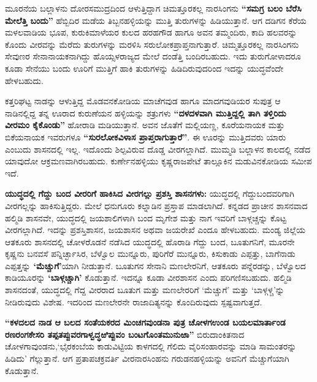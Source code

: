 ಮೂರನೆಯ ಬಲ್ಲಾಳನು ದೋರಸಮುದ್ರದಿಂದ ಆಳುತ್ತಿದ್ದಾಗ ಚಿಮತ್ತೂರಕಲ್ಲ ನಾರಸಿಂಗನು \textbf{“ಸಮಗ್ರ ಬಲಂ ಬೆರೆಸಿ ಮೇಲೆತ್ತಿ ಬಂದು” }ಹೆಬ್ಬಿದಿರ ಮಡೆಯ ತಿಬ್ಬನಹಳ್ಳಿಯನ್ನು ಮುತ್ತಿ ತುರುಗಳನ್ನು ಹಿಡಿಯುತ್ತಾನೆ. ಆಗ ದಡಿಗನ ಕೆರೆಯ ಮಳಲವಾಡಿಯ ಭೂಪ, ಕುರುಕಿಮಾಳೆಯರ ಕುಲದ ಹರಹಗೌಡ ಹಾಗೂ ಅವನ ತಮ್ಮಂದಿರು, ಕಾದಿ ಹಲವರನ್ನು ಕೊಂದು ವೀರವನ್ನು ಮೆರೆದು ತುರುಗಳನ್ನು ಮರಳಿಸಿ ಸರುಲೋಕಪ್ರಾಪ್ತನಾಗುತ್ತಾರೆ. ಚಿಮ್ಮತ್ತೂರಕಲ್ಲ ನಾರಸಿಂಗನು ಸೇವುಣರ ಸೇನಾನಾಯಕನಾಗಿದ್ದು ಹೊಯ್ಸಳರಾಜ್ಯದ ಮೇಲೆ ದಂಡೆತ್ತಿ ಬಂದಿರಬಹುದು. ಇದು ತುರುಗೋಳಾದರೂ ಕೂಡಾ ಸೇನೆಯು ಬಂದು ಊರಿಗೆ ಮುತ್ತಿಗೆ ಹಾಕಿ ತುರುಗಳನ್ನು ಹಿಡಿದಿರುವುದರಿಂದ ಇದನ್ನು ಯುದ್ಧವೆಂದೇ ಹೇಳಬಹುದು.

ಕತ್ತರಿಘಟ್ಟ ನಾಡನ್ನು ಆಳುತ್ತಿದ್ದ ಮೊಡವನಕೋಡಿಯ ಮಾಚೆಗವುಡ ಹಾಗೂ ಮಾದಗವುಡಿಯರ ಸುಪುತ್ರ ಆ ನಾಡಿನಲ್ಲಿದ್ದ ತನ್ನ ಊರಾದ ಕುರುಣೆಯನ ಹಳ್ಳಿಯನ್ನು ಶತ್ರುಗಳು \textbf{“ದಳದಳವಾಗಿ ಮುತ್ತಿದ್ದಲ್ಲಿ ತಾಗಿ ತಳ್ತಿರಿದು ವೀರಮಂ ಕೈಕೊಂಡು”} ಹೋರಾಡಿ ಮಡಿಯುತ್ತಾನೆ. ಅವನ ಜೊತೆಗೆ ಮಲ್ಲಿಯಣ್ಣ, ಕೂರೆಯನಾಯಕ ಮತ್ತು ಬಿಕೆಯನಾಯಕ ಇವರುಗಳೂ \textbf{“ಸುರಲೋಕವಿಳಾಸ ಪ್ರಾಪ್ತರಾಗುತ್ತಾರೆ”}. ಈ ಊರನ್ನು ಮುತ್ತಿದವರು ಯಾರು ಎಂಬುದು ಶಾಸನದಲ್ಲಿ ಇಲ್ಲ. ಇದೊಂದು ಶಿಲ್ಪವಿರುವ ದೊಡ್ಡ ವೀರಗಲ್ಲಾಗಿದೆ. ಮುಮ್ಮಡಿ ಬಲ್ಲಾಳನ ಕಾಲದಲ್ಲಿ ನಡೆದ ಯಾವುದೋ ಆಕ್ರಮಣವಾಗಿರಬಹುದು. ಕುರ್ಣೇನಹಳ್ಳಿಯು ಕೃಷ್ಣರಾಜಪೇಟೆ ತಾಲ್ಲೂಕಿನ ಮಡುವಿನಕೋಡಿಯ ಸಮೀಪ ಇದೆ.

\textbf{ಯುದ್ಧದಲ್ಲಿ ಗೆದ್ದು ಬಂದ ವೀರರಿಗೆ ಹಾಕಿಸಿದ ವೀರಗಲ್ಲು ಪ್ರಶಸ್ತಿ ಶಾಸನಗಳು:} ಯುದ್ಧದಲ್ಲಿ ಗೆದ್ದುಬಂದವರಿಗಾಗಿ ವೀರಗಲ್ಲನ್ನು ಹಾಕಿಸುತ್ತಿದ್ದರು. ಮೇಲೆ ಧನುಗೂರು ಕಲ್ನಾಡಿನ ಪ್ರಸ್ತಾಪ ಮಾಡಲಾಗಿದೆ. ಕನ್ನಡದ ಪ್ರಾಚೀನ ಶಾಸನವಾದ ಹಲ್ಮಿಡಿ ಶಾಸನವೇ, ಯುದ್ಧದಲ್ಲಿ ಜಯಶಾಲಿಗಳಾಗಿ ಬಂದ ಮೃಗೇಶ ಮತ್ತು ನಾಗ ಇವರಿಗೆ ಬಾಳ್ಗಚ್ಚನ್ನು ಕೊಟ್ಟ ವೀರಗಲ್ಲಾಗಿದೆ. ಇದನ್ನು ಪ್ರಶಸ್ತಿಶಾಸನ, ಜಯಶಾಸನ ಅಥವಾ ಜಯರೇಖೆ ಎಂದೂ ಹೇಳಬಹುದು. ಮಂಡ್ಯ ಜಿಲ್ಲೆಯ ಆತಕೂರು ಶಾಸನದಲ್ಲಿ ಚೋಳರೊಡನೆ ನಡೆಸಿದ ಯುದ್ಧದಲ್ಲಿ ಹೊರಾಡಿ ಗೆದ್ದು ಬಂದ, ಬೂತುಗನಿಗೆ, ಮೂರನೇ ಕೃಷ್ಣನು ಬನವಸೆ ಪನ್ನಿರ್ಚ್ಛಾಸಿರ, ಬೆಳ್ವೊಲ ಮುನ್ನೂರು, ಪುರಿಗೆರೆ ಮುನ್ನೂರು, ಕಿಸುಕಾಡು ಎಪ್ಪತ್ತು, ಬಾಗೆನಾಡು ಎಪ್ಪತ್ತನ್ನು \textbf{‘ಮೆಚ್ಚುಗೆ’}ಯಾಗಿ ನೀಡುತ್ತಾನೆ. ಬೂತುಗನ ಸೇನಾನಿ ಮಣಲೇರನಿಗೆ, ಆತಕೂರು ಪನ್ನೆರಡನ್ನು, ಬೆಳ್ವೊಲದ ಕಾಡಿಯೂರನ್ನು \textbf{‘ಬಾಳ್ಗಚ್ಚಾಗಿ’} ಕೊಡುತ್ತಾನೆ. ಇದನ್ನೂ ಕೂಡಾ ವೀರಶಾಸನ ಎಂದು ಪರಿಗಣಿಸಬಹುದು. ಹಲ್ಮಿಡಿ ಶಾಸನದಂತೆ, ಯುದ್ಧದಲ್ಲಿ ಗೆದ್ದ ವೀರರಾದ ಬೂತುಗ ಮತ್ತು ಮಣಲೇರರಿಗೆ ‘ಮೆಚ್ಚುಗೆ’ ಮತ್ತು ‘ಬಾಳ್ಗಳ್ಚ’ನ್ನು ನೀಡಿರುವುದು ವಿಶೇಷ. ಇದರಿಂದ ಮಣಲೇರನೇ ರಾಜಾದಿತ್ಯನನ್ನು ಕೊಂದಿರುವುದು ಸ್ಪಷ್ಟವಾಗುತ್ತದೆ.

\textbf{“ಕಳದಲದ ನಾಡ ಆ ಬಲದ ಸಂತೆಯಕರದ ಮಿಂಚಗವುಂಡನಾ ಪುತ್ರ ಚೋಳಗಉಂಡ ಬಯಲಮಾರ್ತಾಂಡ ರಣರಂಗಕೇಸರಿ ತಪ್ಪತಪ್ಪುವರಗಾಳ್ವದ್ಧಱಿಪ್ಪುವಂ ಬಂಟಗೊಂತಮುನುಱಾ”} ಬಿರುದಾಂಕಿತನಾದ ಚೋಳಗಾವುಂಡನು,\break ‘ಭೈರಕಂಬೆಯ ಕಾಡುವಿಟ್ಟಿಯ ಕಾಳಗದಲ್ಲಿ ಗೆಲಿದು ವೈರಿಸಂಹಾರವನ್ನು ಮಾಡಿ ಸಾಮಂತರನ್ನು ಹಿಡಿದು’ ಗೆಲ್ಲುತ್ತಾನೆ. ಆಗ ಪ್ರತಾಪಚಕ್ರವರ್ತಿ ವೀರನಾರಸಿಂಹನು ಗರುಡನಹಳ್ಳಿಯನ್ನು ಅವನಿಗೆ ಮೆಚ್ಚುಗೆಯಾಗಿ ಕೊಡುತ್ತಾನೆ.

